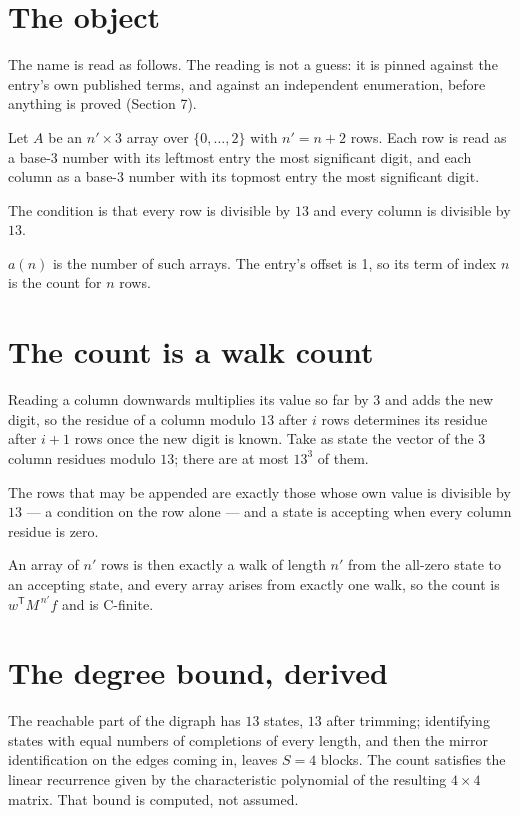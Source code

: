 \documentclass[11pt]{article}
\theoremstyle{definition}
\begin{document}
\section{The object}

The name is read as follows. The reading is not a guess: it is pinned against the entry's own published terms, and against an independent enumeration, before anything is proved (Section 7).

Let $A$ be an $n' \times 3$ array over $\{0,\dots,2\}$ with $n' = n + 2$ rows. Each row is read as a base-$3$ number with its leftmost entry the most significant digit, and each column as a base-$3$ number with its topmost entry the most significant digit.

The condition is that every row is divisible by $13$ and every column is divisible by $13$.

$a(n)$ is the number of such arrays. The entry's offset is 1, so its term of index $n$ is the count for $n$ rows.

\section{The count is a walk count}

Reading a column downwards multiplies its value so far by $3$ and adds the new digit, so the residue of a column modulo $13$ after $i$ rows determines its residue after $i+1$ rows once the new digit is known. Take as state the vector of the $3$ column residues modulo $13$; there are at most $13^{3}$ of them.

The rows that may be appended are exactly those whose own value is divisible by $13$ --- a condition on the row alone --- and a state is accepting when every column residue is zero.

An array of $n'$ rows is then exactly a walk of length $n'$ from the all-zero state to an accepting state, and every array arises from exactly one walk, so the count is $w^{\mathsf T}M^{\,n'}f$ and is C-finite.

\section{The degree bound, derived}

The reachable part of the digraph has $13$ states, $13$ after trimming; identifying states with equal numbers of completions of every length, and then the mirror identification on the edges coming in, leaves $S = 4$ blocks. The count satisfies the linear recurrence given by the characteristic polynomial of the resulting $4\times4$ matrix. That bound is computed, not assumed.
\end{document}
